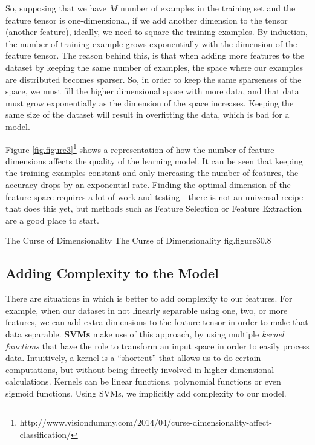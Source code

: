 So, supposing that we have $M$ number of examples in the training set and 
the feature tensor is one-dimensional, if we add another dimension to the 
tensor (another feature), ideally, we need to square the training examples. 
By induction, the number of training example grows exponentially with the 
dimension of the feature tensor. The reason behind this, is that when adding 
more features to the dataset by keeping the same number of examples, the 
space where our examples are distributed becomes sparser. So, in order to 
keep the same sparseness of the space, we must fill the higher dimensional 
space with more data, and that data must grow exponentially as the dimension 
of the space increases. Keeping the same size of the dataset will result in 
overfitting the data, which is bad for a model.

Figure \ref{fig.figure3}\footnote{http://www.visiondummy.com/2014/04/curse-dimensionality-affect-classification/} shows a representation of how the number of feature dimensions 
affects the quality of the learning model. It can be seen that keeping the 
training examples constant and only increasing the number of features, the 
accuracy drops by an exponential rate. Finding the optimal dimension of the 
feature space requires a lot of work and testing - there is not an universal 
recipe that does this yet, but methods such as Feature Selection or Feature 
Extraction are a good place to start. 

%
    {The Curse of Dimensionality}%
    {The Curse of Dimensionality}%
    {fig.figure3}{0.8}

\subsection{Adding Complexity to the Model}

There are situations in which is better to add complexity to our features. 
For example, when our dataset in not linearly separable using one, two, or more 
features, we can add extra dimensions to the feature tensor in order to make 
that data separable. {\bf SVMs} make use of this approach, by using multiple 
{\it kernel functions} that have the role to transform an input space in order 
to easily process data. Intuitively, a kernel is a ``shortcut'' that allows us 
to do certain computations, but without being directly involved in higher-dimensional 
calculations. Kernels can be linear functions, polynomial functions or even sigmoid 
functions. Using SVMs, we implicitly add complexity to our model.

